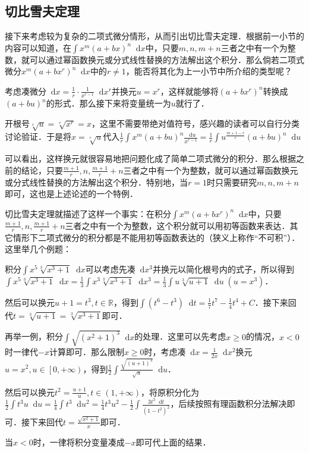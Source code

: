 \documentclass{ctexbook}
\newcommand*{\dif}{\mathop{}\!\mathrm{d}}
\begin{document}
\subsection{切比雪夫定理}
接下来考虑较为复杂的二项式微分情形，从而引出切比雪夫定理．根据前一小节的内容可以知道，在$\int x^{m}\left(a+bx\right)^{n}\dif{x}$中，只要$m,n,m+n$三者之中有一个为整数，就可以通过幂函数换元或分式线性替换的方法解出这个积分．那么倘若二项式微分$x^{m}\left(a+bx^{r}\right)^{n}\dif{x}$中的$r\ne1$，能否将其化为上一小节中所介绍的类型呢？\par
考虑凑微分$\dif{x}=\frac{1}{r}\cdot\frac{1}{x^{r-1}}\dif{x^{r}}$并换元$u=x^{r}$，这样就能够将$\left(a+bx^{r}\right)^{n}$转换成$\left(a+bu\right)^{n}$的形式．那么接下来将变量统一为$u$就行了．\par
开根号$\sqrt[r]{u}=\sqrt[r]{x^{r}}=x$，这里不需要带绝对值符号，感兴趣的读者可以自行分类讨论验证．于是将$x=\sqrt[r]{u}$代入$\frac{1}{r}\int x^{m}\left(a+bu\right)^{n}\frac{\dif{u}}{x^{r-1}}=\frac{1}{r}\int u^{\frac{m+1-r}{r}}{\left(a+bu\right)^{n}}\dif{u}$\par
可以看出，这样换元就很容易地把问题化成了简单二项式微分的积分．那么根据之前的结论，只要$\frac{m+1}{r},n,\frac{m+1}{r}+n$三者之中有一个为整数，就可以通过幂函数换元或分式线性替换的方法解出这个积分．特别地，当$r=1$时只需要研究$m,n,m+n$即可，这也是上述论述的一个特例．\par
切比雪夫定理就描述了这样一个事实：在积分$\int x^{m}\left(a+bx^{r}\right)^{n}\dif{x}$中，只要$\frac{m+1}{r},n,\frac{m+1}{r}+n$三者之中有一个为整数，这个积分就可以用初等函数来表达．其它情形下二项式微分的积分都是不能用初等函数表达的（狭义上称作“不可积”）．这里举几个例题：\par
积分$\int x^{5}\sqrt[3]{x^{3}+1}\dif{x}$可以考虑先凑$\dif{x^{3}}$并换元以简化根号内的式子，所以得到$\int x^{5}\sqrt[3]{x^{3}+1}\dif{x}=\frac{1}{3}\int x^{3}\sqrt[3]{x^{3}+1}\dif{x^{3}}=\frac{1}{3}\int u\sqrt[3]{u+1}\dif{u}\;\left(u=x^{3}\right)$．\par
然后可以换元$u+1=t^{3},t\in\mathbb{R}$，得到$\int\left(t^{6}-t^{3}\right)\dif{t}=\frac{1}{7}t^{7}-\frac{1}{4}t^{4}+C$．接下来回代$t=\sqrt[3]{u+1}=\sqrt[3]{x^{3}+1}$即可．\par
再举一例，积分$\int\sqrt{\left(x^{2}+1\right)^{3}}\dif{x}$的处理．这里可以先考虑$x\ge0$的情况，$x<0$时一律代$-x$计算即可．那么限制$x\ge0$时，考虑凑$\dif{x}=\frac{1}{2x}\dif{x^{2}}$换元$u=x^{2},u\in\left[0,+\infty\right)$，得到$\frac{1}{2}\int\frac{\sqrt{\left(u+1\right)^{3}}}{\sqrt{u}}\dif{u}$．\par
然后可以换元$t^{2}=\frac{u+1}{u},t\in\left(1,+\infty\right)$，将原积分化为$\frac{1}{2}\int t^{3}u\dif{u}=\frac{1}{4}\int t^{3}\dif{u^{2}}=\frac{1}{4}t^{3}u^{2}-\frac{1}{2}\int\frac{3t^{2}\dif{t}}{\left(1-t^{2}\right)^{2}}$，后续按照有理函数积分法解决即可．接下来回代$t=\frac{\sqrt{x^{2}+1}}{x}$即可．\par
当$x<0$时，一律将积分变量凑成$-x$即可代上面的结果．\par
\end{document}
